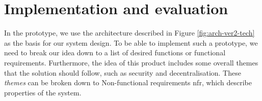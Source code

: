 \section{Implementation and evaluation}\label{sec:implementation}
% 
In the prototype, we use the architecture described in Figure \ref{fig:arch-ver2-tech} as the basis for our system design. To be able to implement such a prototype, we need to break our idea down to a list of desired functions or functional requirements. Furthermore, the idea of this product includes some overall themes that the solution should follow, such as security and decentralisation. These \textit{themes} can be broken down to Non-functional requirements \acrshort{nfr}, which describe properties of the system.












